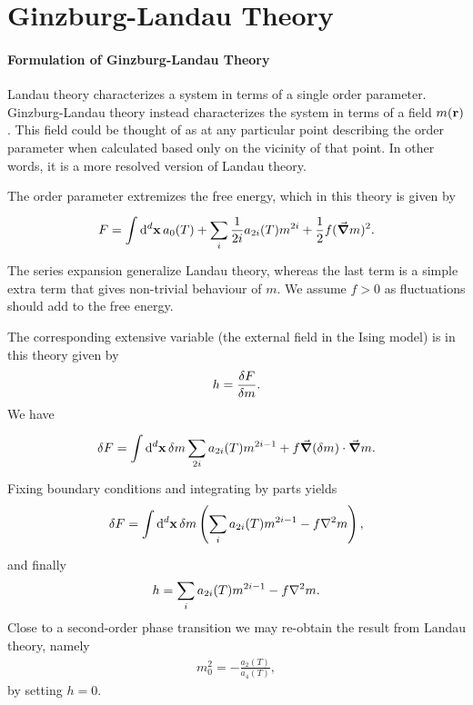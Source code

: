 \section{Ginzburg-Landau Theory}

\paragraph{Formulation of Ginzburg-Landau Theory}
Landau theory characterizes a system in terms of a single order parameter. Ginzburg-Landau theory instead characterizes the system in terms of a field $m(\vb{r})$. This field could be thought of as at any particular point describing the order parameter when calculated based only on the vicinity of that point. In other words, it is a more resolved version of Landau theory.

The order parameter extremizes the free energy, which in this theory is given by
\begin{align*}
	F = \int\limits_{}^{}\dd[d]{\vb{x}}a_{0}(T) + \sum\limits_{i}\frac{1}{2i}a_{2i}(T)m^{2i} + \frac{1}{2}f(\grad{m})^{2}.
\end{align*}
The series expansion generalize Landau theory, whereas the last term is a simple extra term that gives non-trivial behaviour of $m$. We assume $f > 0$ as fluctuations should add to the free energy.

The corresponding extensive variable (the external field in the Ising model) is in this theory given by
\begin{align*}
	h = \fdv{F}{m}.
\end{align*}
We have
\begin{align*}
	\var{F} = \int\limits_{}^{}\dd[d]{\vb{x}}\var{m}\sum\limits_{2i}a_{2i}(T)m^{2i - 1} + f\grad{(\var{m})}\cdot\grad{m}.
\end{align*}
Fixing boundary conditions and integrating by parts yields
\begin{align*}
	\var{F} = \integ[d]{}{}{\vb{x}}{\var{m}\left(\sum\limits_{i}a_{2i}(T)m^{2i - 1} - f\laplacian{m}\right)},
\end{align*}
and finally
\begin{align*}
	h = \sum\limits_{i}a_{2i}(T)m^{2i - 1} - f\laplacian{m}.
\end{align*}
Close to a second-order phase transition we may re-obtain the result from Landau theory, namely
\begin{align*}
	m_{0}^{2} = -\frac{a_{2}(T)}{a_{4}(T)},
\end{align*}
by setting $h = 0$.

